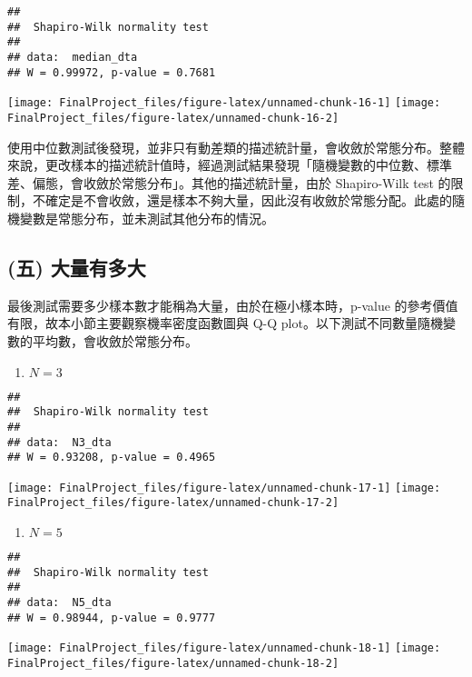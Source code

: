 \documentclass[]{article}
\providecommand{\tightlist}{%
  \setlength{\itemsep}{0pt}\setlength{\parskip}{0pt}}
\begin{document}
\begin{verbatim}
## 
##  Shapiro-Wilk normality test
## 
## data:  median_dta
## W = 0.99972, p-value = 0.7681
\end{verbatim}

\texttt{[image: FinalProject\_files/figure-latex/unnamed-chunk-16-1]}
\texttt{[image: FinalProject\_files/figure-latex/unnamed-chunk-16-2]}

使用中位數測試後發現，並非只有動差類的描述統計量，會收斂於常態分布。整體來說，更改樣本的描述統計值時，經過測試結果發現「隨機變數的中位數、標準差、偏態，會收斂於常態分布」。其他的描述統計量，由於
Shapiro-Wilk test
的限制，不確定是不會收斂，還是樣本不夠大量，因此沒有收斂於常態分配。此處的隨機變數是常態分布，並未測試其他分布的情況。

\hypertarget{-}{%
\subsection{(五) 大量有多大}\label{-}}

最後測試需要多少樣本數才能稱為大量，由於在極小樣本時，p-value
的參考價值有限，故本小節主要觀察機率密度函數圖與 Q-Q
plot。以下測試不同數量隨機變數的平均數，會收斂於常態分布。

\begin{enumerate}
\def\labelenumi{\arabic{enumi}.}
\tightlist
\item
  \(N = 3\)
\end{enumerate}

\begin{verbatim}
## 
##  Shapiro-Wilk normality test
## 
## data:  N3_dta
## W = 0.93208, p-value = 0.4965
\end{verbatim}

\texttt{[image: FinalProject\_files/figure-latex/unnamed-chunk-17-1]}
\texttt{[image: FinalProject\_files/figure-latex/unnamed-chunk-17-2]}

\begin{enumerate}
\def\labelenumi{\arabic{enumi}.}
\setcounter{enumi}{1}
\tightlist
\item
  \(N = 5\)
\end{enumerate}

\begin{verbatim}
## 
##  Shapiro-Wilk normality test
## 
## data:  N5_dta
## W = 0.98944, p-value = 0.9777
\end{verbatim}

\texttt{[image: FinalProject\_files/figure-latex/unnamed-chunk-18-1]}
\texttt{[image: FinalProject\_files/figure-latex/unnamed-chunk-18-2]}
\end{document}
